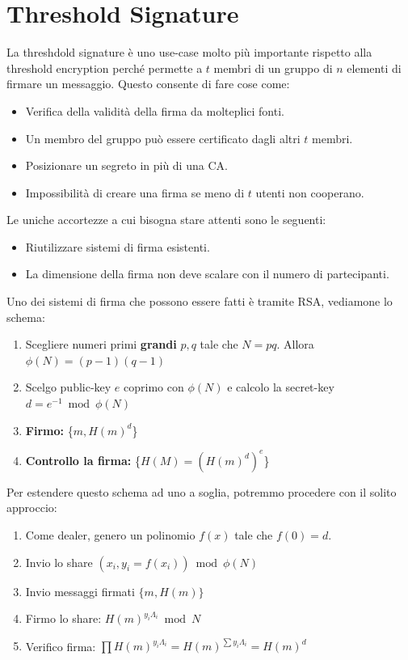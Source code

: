 \section{Threshold Signature}
La threshdold signature è uno use-case molto più importante rispetto alla threshold encryption perché permette a $t$ membri di un gruppo di $n$ elementi di firmare un messaggio. Questo consente di fare cose come:
\begin{itemize}
    \item Verifica della validità della firma da molteplici fonti.
    \item Un membro del gruppo può essere certificato dagli altri $t$ membri.
    \item Posizionare un segreto in più di una CA.
    \item Impossibilità di creare una firma se meno di $t$ utenti non cooperano.
\end{itemize}
Le uniche accortezze a cui bisogna stare attenti sono le seguenti: 
\begin{itemize}
    \item Riutilizzare sistemi di firma esistenti.
    \item La dimensione della firma non deve scalare con il numero di partecipanti.
\end{itemize}
Uno dei sistemi di firma che possono essere fatti è tramite RSA, vediamone lo schema:
\begin{definition}\label{def:rsasign}
\begin{enumerate}
    \item Scegliere numeri primi \textbf{grandi} $p,q$ tale che $N=pq$. Allora $\phi(N)=(p-1)(q-1)$
    \item Scelgo public-key $e$ coprimo con $\phi(N)$ e calcolo la secret-key $d=e^{-1}\bmod\phi(N)$
    \item \textbf{Firmo:} \{$m,H(m)^d$\}
    \item \textbf{Controllo la firma:} \{$H(M)=(H(m)^d)^e$\}
\end{enumerate}
\end{definition}
\pagebreak
Per estendere questo schema ad uno a soglia, potremmo procedere con il solito approccio:
\begin{enumerate}
    \item Come dealer, genero un polinomio $f(x)$ tale che $f(0)=d$.
    \item Invio lo share $(x_i,y_i=f(x_i))\bmod\phi(N)$
    \item Invio messaggi firmati $\{m, H(m)\}$
    \item Firmo lo share: $H(m)^{y_i\Lambda_i}\bmod{N}$
    \item Verifico firma: $\prod H(m)^{y_i\Lambda_i}=H(m)^{\sum y_i\Lambda_i}=H(m)^d$
\end{enumerate}
